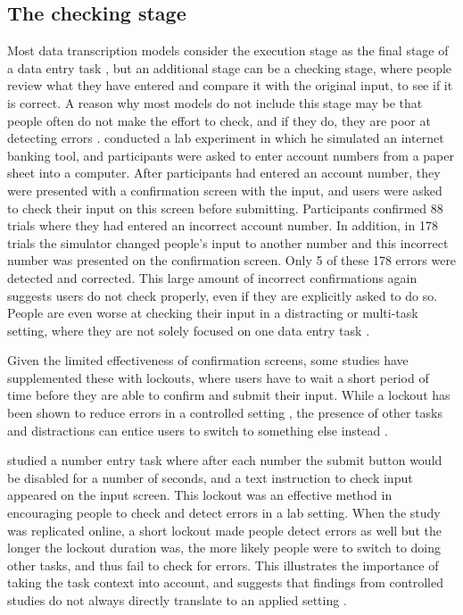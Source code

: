 \subsection{The checking stage}
Most data transcription models consider the execution stage as the final stage of a data entry task \citep{Card1983, Salthouse1986}, but an additional stage can be a checking stage, where people review what they have entered and compare it with the original input, to see if it is correct. A reason why most models do not include this stage may be that people often do not make the effort to check, and if they do, they are poor at detecting errors \citep{Olsen2008}. \citet{Olsen2008} conducted a lab experiment in which he simulated an internet banking tool, and participants were asked to enter account numbers from a paper sheet into a computer. After participants had entered an account number, they were presented with a confirmation screen with the input, and users were asked to check their input on this screen before submitting.  Participants confirmed 88 trials where they had entered an incorrect account number. In addition, in 178 trials the simulator changed people's input to another number and this incorrect number was presented on the confirmation screen. Only 5 of these 178 errors were detected and corrected. This large amount of incorrect confirmations again suggests users do not check properly, even if they are explicitly asked to do so. People are even worse at checking their input in a distracting or multi-task setting, where they are not solely focused on one data entry task \citep{Wiseman2015}.

Given the limited effectiveness of confirmation screens, some studies have supplemented these with lockouts, where users have to wait a short period of time before they are able to confirm and submit their input. While a lockout has been shown to reduce errors in a controlled setting \citep{Gould2016b}, the presence of other tasks and distractions can entice users to switch to something else instead \citep{Gould2016b, Katidioti2013}.

\citet{Gould2016b} studied a number entry task where after each number the submit button would be disabled for a number of seconds, and a text instruction to check input appeared on the input screen.  This lockout was an effective method in encouraging people to check and detect errors in a lab setting. When the study was replicated online, a short lockout made people detect errors as well but the longer the lockout duration was, the more likely people were to switch to doing other tasks, and thus fail to check for errors. This illustrates the importance of taking the task context into account, and suggests that findings from controlled studies do not always directly translate to an applied setting \citep{Gould2016b}. 

